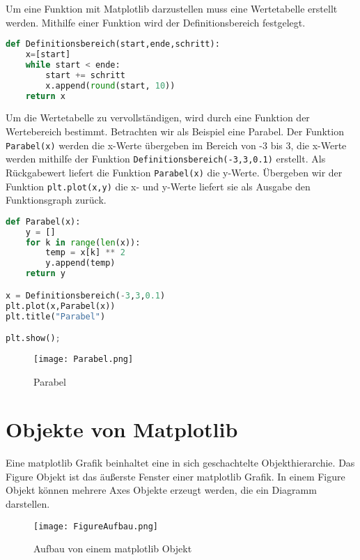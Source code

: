 Um eine Funktion mit Matplotlib darzustellen muss  eine Wertetabelle erstellt werden. Mithilfe einer Funktion wird der Definitionsbereich festgelegt.

\begin{lstlisting}[caption= die Funktion Definitionsbereich, label=lst:Definitionsbereich,language=Python]
def Definitionsbereich(start,ende,schritt):
    x=[start]
    while start < ende:
        start += schritt
        x.append(round(start, 10))
    return x
\end{lstlisting}

Um die Wertetabelle zu vervollständigen, wird durch eine Funktion der Wertebereich bestimmt. Betrachten wir als Beispiel eine Parabel. Der Funktion \texttt{Parabel(x)} werden die x-Werte übergeben im Bereich von -3 bis 3, die x-Werte werden mithilfe der Funktion \texttt{Definitionsbereich(-3,3,0.1)} erstellt. Als Rückgabewert liefert die Funktion \texttt{Parabel(x)} die y-Werte. Übergeben wir der Funktion \texttt{plt.plot(x,y)} die x- und y-Werte liefert sie als Ausgabe den Funktionsgraph zurück.

\begin{lstlisting}[caption= Parabel, label=lst:Parabel,language=Python]
def Parabel(x):
    y = []
    for k in range(len(x)):
        temp = x[k] ** 2
        y.append(temp)
    return y

x = Definitionsbereich(-3,3,0.1)
plt.plot(x,Parabel(x))
plt.title("Parabel")

plt.show();
\end{lstlisting}

\begin{figure}[!htb]
\centering
\texttt{[image: Parabel.png]}
\caption{Parabel}
\label{img:Parabel}
\end{figure}

\section{Objekte von Matplotlib} \label{sec:Objekte von Matplotlib}

Eine matplotlib Grafik beinhaltet eine in sich geschachtelte Objekthierarchie. Das Figure Objekt ist das äußerste Fenster einer matplotlib Grafik. In einem Figure Objekt können mehrere Axes Objekte erzeugt werden, die ein Diagramm darstellen.



\begin{figure}[!htb]
\centering
\texttt{[image: FigureAufbau.png]}
\caption{Aufbau von einem matplotlib Objekt \cite{matplotlib}}
\label{img:FigureObjekt}
\end{figure}


